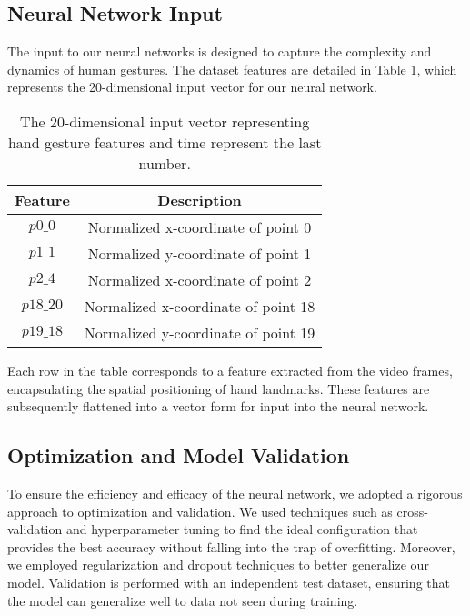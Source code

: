\documentclass{article}
\begin{document}
\subsection{Neural Network Input}

The input to our neural networks is designed to capture the complexity and dynamics of human gestures. The dataset features are detailed in Table \ref{tab:dataset_features}, which represents the 20-dimensional input vector for our neural network.

\begin{table}[h]
\centering
\begin{tabular}{|c|c|}
\hline
\textbf{Feature} & \textbf{Description} \\ \hline
\( p0\_0 \) & Normalized x-coordinate of point 0 \\ \hline
\( p1\_1 \) & Normalized y-coordinate of point 1 \\ \hline
\( p2\_4 \) & Normalized x-coordinate of point 2 \\ \hline
\( p18\_20 \) & Normalized x-coordinate of point 18 \\ \hline
\( p19\_18 \) & Normalized y-coordinate of point 19 \\ \hline

\end{tabular}
\caption{The 20-dimensional input vector representing hand gesture features and time represent the last number.}
\label{tab:dataset_features}
\end{table}

Each row in the table corresponds to a feature extracted from the video frames, encapsulating the spatial positioning of hand landmarks. These features are subsequently flattened into a vector form for input into the neural network.

\subsection{Optimization and Model Validation}

To ensure the efficiency and efficacy of the neural network, we adopted a rigorous approach to optimization and validation. We used techniques such as cross-validation and hyperparameter tuning to find the ideal configuration that provides the best accuracy without falling into the trap of overfitting. Moreover, we employed regularization and dropout techniques to better generalize our model. Validation is performed with an independent test dataset, ensuring that the model can generalize well to data not seen during training.
\end{document}

